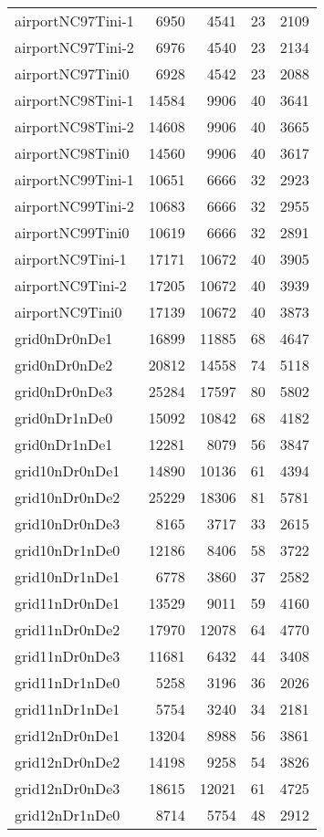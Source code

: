 \begin{tabular}{lrrrr}
airportNC97Tini-1 & 6950 & 4541 & 23 & 2109 \\
airportNC97Tini-2 & 6976 & 4540 & 23 & 2134 \\
airportNC97Tini0 & 6928 & 4542 & 23 & 2088 \\
airportNC98Tini-1 & 14584 & 9906 & 40 & 3641 \\
airportNC98Tini-2 & 14608 & 9906 & 40 & 3665 \\
airportNC98Tini0 & 14560 & 9906 & 40 & 3617 \\
airportNC99Tini-1 & 10651 & 6666 & 32 & 2923 \\
airportNC99Tini-2 & 10683 & 6666 & 32 & 2955 \\
airportNC99Tini0 & 10619 & 6666 & 32 & 2891 \\
airportNC9Tini-1 & 17171 & 10672 & 40 & 3905 \\
airportNC9Tini-2 & 17205 & 10672 & 40 & 3939 \\
airportNC9Tini0 & 17139 & 10672 & 40 & 3873 \\
grid0nDr0nDe1 & 16899 & 11885 & 68 & 4647 \\
grid0nDr0nDe2 & 20812 & 14558 & 74 & 5118 \\
grid0nDr0nDe3 & 25284 & 17597 & 80 & 5802 \\
grid0nDr1nDe0 & 15092 & 10842 & 68 & 4182 \\
grid0nDr1nDe1 & 12281 & 8079 & 56 & 3847 \\
grid10nDr0nDe1 & 14890 & 10136 & 61 & 4394 \\
grid10nDr0nDe2 & 25229 & 18306 & 81 & 5781 \\
grid10nDr0nDe3 & 8165 & 3717 & 33 & 2615 \\
grid10nDr1nDe0 & 12186 & 8406 & 58 & 3722 \\
grid10nDr1nDe1 & 6778 & 3860 & 37 & 2582 \\
grid11nDr0nDe1 & 13529 & 9011 & 59 & 4160 \\
grid11nDr0nDe2 & 17970 & 12078 & 64 & 4770 \\
grid11nDr0nDe3 & 11681 & 6432 & 44 & 3408 \\
grid11nDr1nDe0 & 5258 & 3196 & 36 & 2026 \\
grid11nDr1nDe1 & 5754 & 3240 & 34 & 2181 \\
grid12nDr0nDe1 & 13204 & 8988 & 56 & 3861 \\
grid12nDr0nDe2 & 14198 & 9258 & 54 & 3826 \\
grid12nDr0nDe3 & 18615 & 12021 & 61 & 4725 \\
grid12nDr1nDe0 & 8714 & 5754 & 48 & 2912 \\

\end{tabular}
